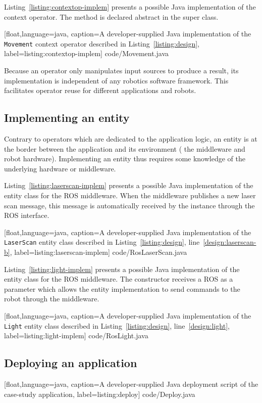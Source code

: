Listing~\ref{listing:contextop-implem} presents a possible Java
implementation of the  context operator. The
 method is declared abstract in the
 super class.

%
[float,language=java,%
caption={A developer-supplied Java implementation of the \texttt{Movement}
  context operator described in Listing~\ref{listing:design}},%
label={listing:contextop-implem}]%
{code/Movement.java}

Because an operator only manipulates input sources to produce a
result, its implementation is independent of any robotics software
framework. This facilitates operator reuse for different applications
and robots.

\subsection{Implementing an entity}

Contrary to operators which are dedicated to the application logic, an
entity is at the border between the application and its environment
(\eg{} the middleware and robot hardware). Implementing an entity thus
requires some knowledge of the underlying hardware or middleware.

Listing~\ref{listing:laserscan-implem} presents a possible Java
implementation of the  entity class for the ROS
middleware. When the middleware publishes a new laser scan message,
this message is automatically received by the 
instance through the ROS  interface.

%
[float,language=java,%
caption={A developer-supplied Java implementation of the
  \texttt{LaserScan} entity class described in
  Listing~\ref{listing:design}, line~\ref{design:laserscan-b}},%
label={listing:laserscan-implem}]%
{code/RosLaserScan.java}

Listing~\ref{listing:light-implem} presents a possible Java
implementation of the  entity class for the ROS middleware.
The constructor receives a ROS  as a parameter which
allows the entity implementation to send commands to the robot through
the middleware.

%
[float,language=java,%
caption={A developer-supplied Java implementation of the
  \texttt{Light} entity class described in
  Listing~\ref{listing:design}, line~\ref{design:light}},%
label={listing:light-implem}]%
{code/RosLight.java}

\subsection{Deploying an application}


%
[float,language=java,%
caption={A developer-supplied Java deployment script of the
 case-study application},%
label={listing:deploy}]%
{code/Deploy.java}

